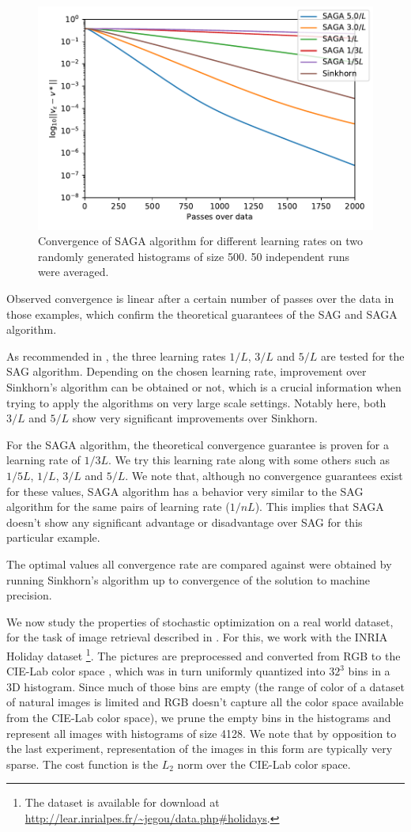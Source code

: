 \begin{figure}[h]
    \centering
    \includegraphics[width=0.49\linewidth]{figures/lr_bench_saga.pdf}
    \caption{Convergence of SAGA algorithm for different learning rates on two randomly generated histograms of size 500. 50 independent runs were averaged.}
\end{figure}

Observed convergence is linear after a certain number of passes over the data in those examples, which confirm the theoretical guarantees of the SAG and SAGA algorithm. 

As recommended in \cite{schmidt_minimizing_2013}, the three learning rates $1/L$, $3/L$ and $5/L$ are tested for the SAG algorithm. Depending on the chosen learning rate, improvement over Sinkhorn's algorithm can be obtained or not, which is a crucial information when trying to apply the algorithms on very large scale settings. Notably here, both $3/L$ and $5/L$ show very significant improvements over Sinkhorn.

For the SAGA algorithm, the theoretical convergence guarantee is proven for a learning rate of $1/3L$. We try this learning rate along with some others such as $1/5L$, $1/L$, $3/L$ and $5/L$. We note that, although no convergence guarantees exist for these values, SAGA algorithm has a behavior very similar to the SAG algorithm for the same pairs of learning rate ($1/nL$). This implies that SAGA doesn't show any significant advantage or disadvantage over SAG for this particular example. 

The optimal values all convergence rate are compared against were obtained by running Sinkhorn's algorithm up to convergence of the solution to machine precision.

We now study the properties of stochastic optimization on a real world dataset, for the task of image retrieval described in \cite{rubner_earth_2000}. For this, we work with the INRIA Holiday dataset \cite{forsyth_hamming_2008}\footnote{The dataset is available for download at \href{http://lear.inrialpes.fr/~jegou/data.php\#holidays}{\url{http://lear.inrialpes.fr/~jegou/data.php\#holidays}}.}. The pictures are preprocessed and converted from RGB to the CIE-Lab color space \cite{wyszecki_color_2000}, which was in turn uniformly quantized into $32^3$ bins in a 3D histogram. Since much of those bins are empty (the range of color of a dataset of natural images is limited and RGB doesn't capture all the color space available from the CIE-Lab color space), we prune the empty bins in the histograms and represent all images with histograms of size 4128. We note that by opposition to the last experiment, representation of the images in this form are typically very sparse. The cost function is the $L_2$ norm over the CIE-Lab color space.

